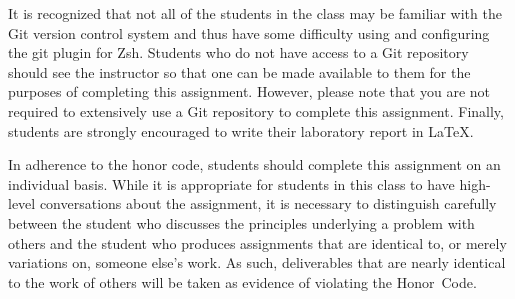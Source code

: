 It is recognized that not all of the students in the class may be familiar with the Git version control system and thus have some
difficulty using and configuring the git plugin for Zsh.  Students who do not have access to a Git repository should see the
instructor so that one can be made available to them for the purposes of completing this assignment. However, please note that you
are not required to extensively use a Git repository to complete this assignment. Finally, students are strongly encouraged to
write their laboratory report in \LaTeX.

In adherence to the honor code, students should complete this assignment on an individual basis. While it is appropriate for
students in this class to have high-level conversations about the assignment, it is necessary to distinguish carefully between the
student who discusses the principles underlying a problem with others and the student who produces assignments that are identical
to, or merely variations on, someone else's work.  As such, deliverables that are nearly identical to the work of others will be
taken as evidence of violating the \mbox{Honor Code}.  




